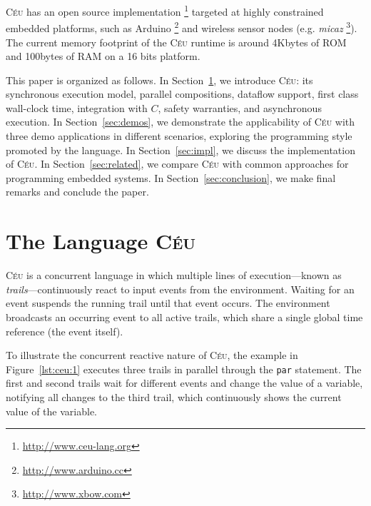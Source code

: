 \documentclass{sigplan-proc}
\newcommand{\2}{\;\;}
\newcommand{\5}{\;\;\;\;\;}
\newcommand{\CEU}{\textsc{C\'{e}u}}
\newcommand{\code}[1] {{\small{\texttt{#1}}}}
\begin{document}
\CEU{} has an open source implementation%
\footnote{\url{http://www.ceu-lang.org}}
targeted at highly constrained embedded platforms, such as Arduino%
\footnote{\url{http://www.arduino.cc}}
and wireless sensor nodes (e.g. \emph{micaz}%
\footnote{\url{http://www.xbow.com}}).
The current memory footprint of the \CEU{} runtime is around 4Kbytes of ROM and 
100bytes of RAM on a 16 bits platform.

This paper is organized as follows.
In Section~\ref{sec:ceu}, we introduce \CEU: its synchronous execution model, 
parallel compositions, dataflow support, first class wall-clock time, 
integration with $C$, safety warranties, and asynchronous execution.
In Section~\ref{sec:demos}, we demonstrate the applicability of \CEU{} with 
three demo applications in different scenarios, exploring the programming style 
promoted by the language.
In Section~\ref{sec:impl}, we discuss the implementation of \CEU.
In Section~\ref{sec:related}, we compare \CEU{} with common approaches for 
programming embedded systems.
In Section~\ref{sec:conclusion}, we make final remarks and conclude the paper.

\section{The Language \CEU}
\label{sec:ceu}

\CEU{} is a concurrent language in which multiple lines of execution---known as 
\emph{trails}---continuously react to input events from the environment.
Waiting for an event suspends the running trail until that event occurs.
The environment broadcasts an occurring event to all active trails, which share 
a single global time reference (the event itself).

To illustrate the concurrent reactive nature of \CEU{}, the example in 
Figure~\ref{lst:ceu:1} executes three trails in parallel through the \code{par} 
statement.
The first and second trails wait for different events and change the value of a 
variable, notifying all changes to the third trail, which continuously shows 
the current value of the variable.
 
\end{document}
